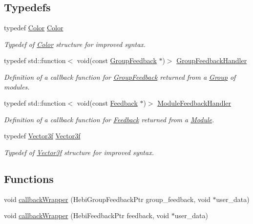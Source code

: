 \subsection*{Typedefs}
\begin{DoxyCompactItemize}
\item 
typedef \hyperlink{structhebi_1_1Color}{Color} \hyperlink{namespacehebi_a17b5d397bfee3f6a79256d661b3033ae}{Color}
\begin{DoxyCompactList}\small\item\em Typedef of \hyperlink{structhebi_1_1Color}{Color} structure for improved syntax. \end{DoxyCompactList}\item 
typedef std\+::function$<$ void(const \hyperlink{classhebi_1_1GroupFeedback}{Group\+Feedback} $\ast$)$>$ \hyperlink{namespacehebi_a0f7ebf2775f29bf8c6eb5f9c590ffdb4}{Group\+Feedback\+Handler}
\begin{DoxyCompactList}\small\item\em Definition of a callback function for \hyperlink{classhebi_1_1GroupFeedback}{Group\+Feedback} returned from a \hyperlink{classhebi_1_1Group}{Group} of modules. \end{DoxyCompactList}\item 
typedef std\+::function$<$ void(const \hyperlink{classhebi_1_1Feedback}{Feedback} $\ast$)$>$ \hyperlink{namespacehebi_acce4dce21ce8c5055ba13532c2355b67}{Module\+Feedback\+Handler}
\begin{DoxyCompactList}\small\item\em Definition of a callback function for \hyperlink{classhebi_1_1Feedback}{Feedback} returned from a \hyperlink{classhebi_1_1Module}{Module}. \end{DoxyCompactList}\item 
typedef \hyperlink{structhebi_1_1Vector3f}{Vector3f} \hyperlink{namespacehebi_a69adb97ac02f8020daed5e1dd3833ff9}{Vector3f}
\begin{DoxyCompactList}\small\item\em Typedef of \hyperlink{structhebi_1_1Vector3f}{Vector3f} structure for improved syntax. \end{DoxyCompactList}\end{DoxyCompactItemize}
\subsection*{Functions}
\begin{DoxyCompactItemize}
\item 
void \hyperlink{namespacehebi_a4170bc4272e0bd8b3cf2e166242fa23e}{callback\+Wrapper} (Hebi\+Group\+Feedback\+Ptr group\+\_\+feedback, void $\ast$user\+\_\+data)
\item 
void \hyperlink{namespacehebi_a1845180fb132e2718803d68a476f30cd}{callback\+Wrapper} (Hebi\+Feedback\+Ptr feedback, void $\ast$user\+\_\+data)
\end{DoxyCompactItemize}


